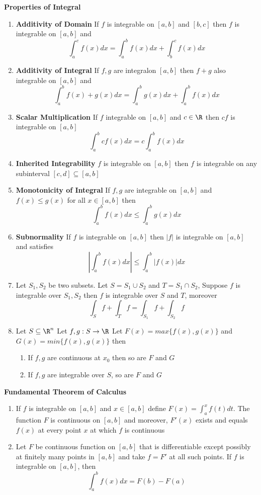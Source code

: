 \documentclass[11pt]{article}
\begin{document}
\begin{defn*}
  \textbf{Properties of Integral}
  \begin{enumerate}
    \item \textbf{Additivity of Domain} If $f$ is integrable on $[a,b]$ and $[b,c]$ then $f$ is integrable on $[a,b]$ and
    \[
      \int_a^c f(x)dx = \int_a^b f(x)dx + \int_b^c f(x)dx
    \]
    \item \textbf{Additivity of Integral} If $f,g$ are integralon $[a,b]$ then $f+g$ also integrable on $[a,b]$ and
    \[
      \int_a^b f(x) + g(x) dx = \int_a^b g(x)dx + \int_a^b f(x)dx
    \]
    \item \textbf{Scalar Multiplication} If $f$ integrable on $[a,b]$ and $c\in\R$ then $cf$ is integrable on $[a,b]$
    \[
      \int_a^b cf(x) dx = c\int_a^b f(x)dx
    \]
    \item \textbf{Inherited Integrability} $f$ is integrable on $[a,b]$ then $f$ is integrable on any subinterval $[c,d]\subseteq [a,b]$
    \item \textbf{Monotonicity of Integral} If $f,g$ are integrable on $[a,b]$ and $f(x)\leq g(x)$ for all $x\in [a,b]$ then
    \[
      \int_a^b f(x)dx \leq \int_a^b g(x)dx
    \]
    \item \textbf{Subnormality} If $f$ is integrable on $[a,b]$ then $|f|$ is integrable on $[a,b]$ and satisfies
    \[
      |\int_a^b f(x)dx|\leq \int_a^b |f(x)|dx
    \]
    \item Let $S_1, S_2$ be two subsets. Let $S = S_1 \cup S_2$ and $T = S_1 \cap S_2$, Suppose $f$ is integrable over $S_1,S_2$ then $f$ is integrable over $S$ and $T$, moreover
    \[
      \int_S f  +\int_T f = \int_{S_1} f + \int_{S_2} f
    \]
    \item Let $S\subseteq \R^n$ Let $f,g:S \to \R$ Let $F(x) = max\{ f(x), g(x)\}$ and $G(x) = min\{ f(x), g(x)\}$ then
    \begin{enumerate}
      \item If $f,g$ are continuous at $x_0$ then so are $F$ and $G$
      \item If $f,g$ are integrable over $S$, so are $F$ and $G$
    \end{enumerate}
  \end{enumerate}
\end{defn*}


\begin{defn*}
  \textbf{Fundamental Theorem of Calculus}
  \begin{enumerate}
    \item If $f$ is integrable on $[a,b]$ and $x\in[a,b]$ define $F(x) = \int_a^x f(t)dt$. The function $F$ is continuous on $[a,b]$ and moreover, $F'(x)$ exists and equals $f(x)$ at every point $x$ at which $f$ is continuous
    \item Let $F$ be continuous function on $[a,b]$ that is differentiable except possibly at finitely many points in $[a,b]$ and take $f =F'$ at all such points. If $f$ is integrable on $[a,b]$, then
    \[
      \int_a^b f(x)dx = F(b) - F(a)
    \]
  \end{enumerate}
\end{defn*}
\end{document}
